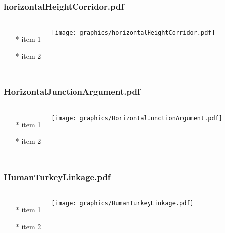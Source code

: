 \begin{frame} \frametitle{horizontalHeightCorridor.pdf}
    \begin{columns}[c]
        \begin{itemize}
            \item[*] item 1
            \item[*] item 2
        \end{itemize}
        \begin{minipage}{\linewidth}
            \begin{center}
            \texttt{[image: graphics/horizontalHeightCorridor.pdf]}
            \label{gfx:horizontalHeightCorridor.pdf}
            \end{center}
        \end{minipage}
    \end{columns}
\end{frame}
\begin{frame} \frametitle{HorizontalJunctionArgument.pdf}
    \begin{columns}[c]
        \begin{itemize}
            \item[*] item 1
            \item[*] item 2
        \end{itemize}
        \begin{minipage}{\linewidth}
            \begin{center}
            \texttt{[image: graphics/HorizontalJunctionArgument.pdf]}
            \label{gfx:HorizontalJunctionArgument.pdf}
            \end{center}
        \end{minipage}
    \end{columns}
\end{frame}
\begin{frame} \frametitle{HumanTurkeyLinkage.pdf}
    \begin{columns}[c]
        \begin{itemize}
            \item[*] item 1
            \item[*] item 2
        \end{itemize}
        \begin{minipage}{\linewidth}
            \begin{center}
            \texttt{[image: graphics/HumanTurkeyLinkage.pdf]}
            \label{gfx:HumanTurkeyLinkage.pdf}
            \end{center}
        \end{minipage}
    \end{columns}
\end{frame}
